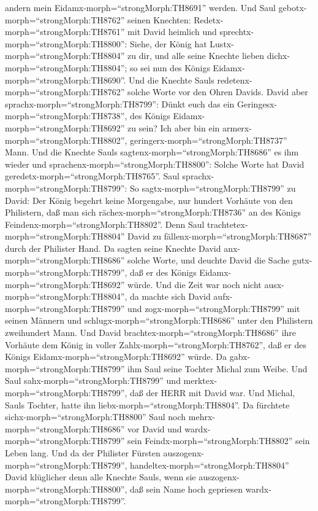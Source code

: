 andern mein Eidamx-morph=``strongMorph:TH8691'' werden. 
Und Saul gebotx-morph=``strongMorph:TH8762'' seinen Knechten:
Redetx-morph=``strongMorph:TH8761'' mit David heimlich und
sprechtx-morph=``strongMorph:TH8800'': Siehe, der König hat
Lustx-morph=``strongMorph:TH8804'' zu dir, und alle seine Knechte lieben
dichx-morph=``strongMorph:TH8804''; so sei nun des Königs
Eidamx-morph=``strongMorph:TH8690''.  Und die Knechte Sauls
redetenx-morph=``strongMorph:TH8762'' solche Worte vor den Ohren Davids.
David aber sprachx-morph=``strongMorph:TH8799'': Dünkt euch das ein
Geringesx-morph=``strongMorph:TH8738'', des Königs
Eidamx-morph=``strongMorph:TH8692'' zu sein? Ich aber bin ein
armerx-morph=``strongMorph:TH8802'',
geringerx-morph=``strongMorph:TH8737'' Mann.  Und die
Knechte Sauls sagtenx-morph=``strongMorph:TH8686'' es ihm wieder und
sprachenx-morph=``strongMorph:TH8800'': Solche Worte hat David
geredetx-morph=``strongMorph:TH8765''.  Saul
sprachx-morph=``strongMorph:TH8799'': So
sagtx-morph=``strongMorph:TH8799'' zu David: Der König begehrt keine
Morgengabe, nur hundert Vorhäute von den Philistern, daß man sich
rächex-morph=``strongMorph:TH8736'' an des Königs
Feindenx-morph=``strongMorph:TH8802''. Denn Saul
trachtetex-morph=``strongMorph:TH8804'' David zu
fällenx-morph=``strongMorph:TH8687'' durch der Philister Hand.
 Da sagten seine Knechte David
anx-morph=``strongMorph:TH8686'' solche Worte, und deuchte David die
Sache gutx-morph=``strongMorph:TH8799'', daß er des Königs
Eidamx-morph=``strongMorph:TH8692'' würde. Und die Zeit war noch nicht
ausx-morph=``strongMorph:TH8804'',  da machte sich David
aufx-morph=``strongMorph:TH8799'' und zogx-morph=``strongMorph:TH8799''
mit seinen Männern und schlugx-morph=``strongMorph:TH8686'' unter den
Philistern zweihundert Mann. Und David
brachtex-morph=``strongMorph:TH8686'' ihre Vorhäute dem König in voller
Zahlx-morph=``strongMorph:TH8762'', daß er des Königs
Eidamx-morph=``strongMorph:TH8692'' würde. Da
gabx-morph=``strongMorph:TH8799'' ihm Saul seine Tochter Michal zum
Weibe.  Und Saul sahx-morph=``strongMorph:TH8799'' und
merktex-morph=``strongMorph:TH8799'', daß der HERR mit David war. Und
Michal, Sauls Tochter, hatte ihn liebx-morph=``strongMorph:TH8804''.
 Da fürchtete sichx-morph=``strongMorph:TH8800'' Saul noch
mehrx-morph=``strongMorph:TH8686'' vor David und
wardx-morph=``strongMorph:TH8799'' sein
Feindx-morph=``strongMorph:TH8802'' sein Leben lang.  Und
da der Philister Fürsten auszogenx-morph=``strongMorph:TH8799'',
handeltex-morph=``strongMorph:TH8804'' David klüglicher denn alle
Knechte Sauls, wenn sie auszogenx-morph=``strongMorph:TH8800'', daß sein
Name hoch gepriesen wardx-morph=``strongMorph:TH8799''.

